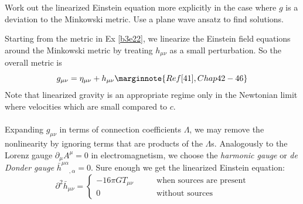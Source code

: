 \documentclass[10pt]{article}
\begin{document}
\begin{example}\label{b3e28}
	Work out the linearized Einstein equation more explicitly in the case where $g$ is a deviation to the Minkowski metric. Use a plane wave ansatz to find solutions.
\end{example}
\sol Starting from the metric in Ex \ref{b3e22}, we linearize the Einstein field equations around the Minkowski metric by treating $h_{\mu\nu}$ as a small perturbation. So the overall metric is
$$
g_{\mu\nu} = \eta_{\mu\nu} + h_{\mu\nu}\marginnote{Ref [41], Chap 42-46}
$$
Note that linearized gravity is an appropriate regime only in the Newtonian limit where velocities which are small compared to $c$.\\\\
Expanding  $g_{\mu\nu}$ in terms of connection coefficients $\Lambda$, we may remove the nonlinearity by ignoring terms that are products of the $\Lambda$s. Analogously to the Lorenz gauge $\partial_\mu A^\mu = 0$ in electromagnetism, we choose the \emph{harmonic gauge} or \emph{de Donder gauge} $\bar{h}^{\mu\alpha}{}_{,\alpha} = 0$. Sure enough we get the linearized Einstein equation:
$$
\partial^2\bar{h}_{\mu\nu} = \begin{cases}
	-16\pi GT_{\mu\nu}\qquad &\text{when sources are present} \\
	0\qquad &\text{without sources}
\end{cases}
$$
\end{document}
